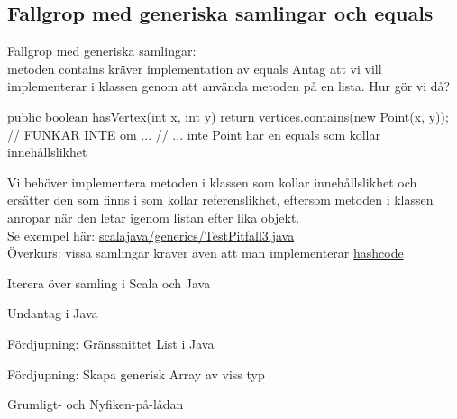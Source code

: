 \subsection{Fallgrop med generiska samlingar och equals}\footnotesize
\begin{Slide}{Fallgrop med generiska samlingar: 
\\ metoden contains kräver implementation av equals}
Antag att vi vill implementerar   i klassen  genom att använda metoden  på en lista. Hur gör vi då?
\pause
\begin{Code}[numberstyle=]
public boolean hasVertex(int x, int y){  
    return vertices.contains(new Point(x, y)); // FUNKAR INTE om ...
    // ... inte Point har en equals som kollar innehållslikhet
}
\end{Code}
Vi behöver implementera metoden  i klassen  som kollar innehållslikhet och ersätter den  som finns i  som kollar referenslikhet, eftersom metoden  i klassen  anropar  när den letar igenom listan efter lika objekt. \\
Se exempel här: \href{https://github.com/lunduniversity/introprog/tree/master/compendium/examples/scalajava/generics/TestPitfall3.java}{scalajava/generics/TestPitfall3.java} \\
\scriptsize Överkurs: vissa samlingar kräver även att man implementerar \href{http://stackoverflow.com/questions/27581/what-issues-should-be-considered-when-overriding-equals-and-hashcode-in-java}{hashcode}
\end{Slide}


\begin{Slide}{Iterera över samling i Scala och Java}
\end{Slide}

\begin{Slide}{Undantag i Java}
\end{Slide}

\begin{Slide}{Fördjupning: Gränssnittet List i Java}
\end{Slide}

\begin{Slide}{Fördjupning: Skapa generisk Array av viss typ}
\end{Slide}

\begin{Slide}{Grumligt- och Nyfiken-på-lådan}
\end{Slide}

\fi










